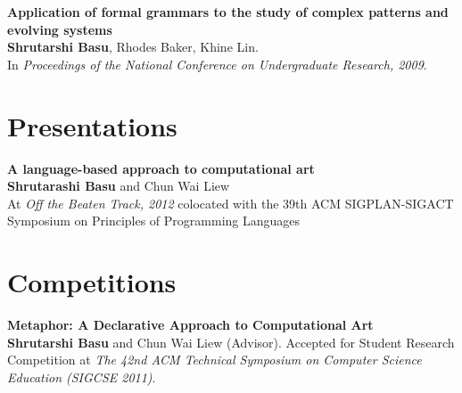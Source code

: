 \documentclass[margin,line]{resume}
\begin{document}
\begin{resume}
    {\bf Application of formal grammars to the study of complex patterns and evolving systems}\\
    {\bf Shrutarshi Basu}, Rhodes Baker, Khine Lin. \\
    In \emph{Proceedings of the National Conference on Undergraduate Research, 2009}.

    \section{Presentations}
    {\bf A language-based approach to computational art}\\
    {\bf Shrutarashi Basu} and Chun Wai Liew\\
    At \emph{Off the Beaten Track, 2012} colocated with the 39th ACM
    SIGPLAN-SIGACT Symposium on Principles of Programming Languages


    \section{Competitions}
    {\bf Metaphor: A Declarative Approach to Computational Art} \\
    {\bf Shrutarshi Basu} and Chun Wai Liew (Advisor). 
    Accepted for Student Research Competition at \emph{The 42nd ACM Technical
      Symposium on Computer Science Education (SIGCSE 2011)}.

\end{resume}
\end{document}
